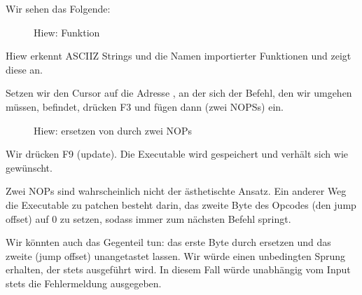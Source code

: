 Wir sehen das Folgende:

\begin{figure}[H]
\centering
{}
\caption{Hiew: \main Funktion}
\label{fig:scanf_ex3_hiew_1}
\end{figure}

Hiew erkennt \ac{ASCIIZ} Strings und die Namen importierter Funktionen und zeigt diese an.

\clearpage
Setzen wir den Cursor auf die Adresse , an der sich der  Befehl, den wir umgehen müssen, befindet,
drücken F3 und fügen dann  (zwei \ac{NOPS}s) ein. 

\begin{figure}[H]
\centering
{}
\caption{Hiew: ersetzen von  durch zwei \ac{NOP}s}
\label{fig:scanf_ex3_hiew_2}
\end{figure}
Wir drücken F9 (update). Die Executable wird gespeichert und verhält sich wie gewünscht.

Zwei \ac{NOP}s sind wahrscheinlich nicht der ästhetischte Ansatz. Ein anderer Weg die Executable zu patchen besteht
darin, das zweite Byte des Opcodes (den \gls{jump offset}) auf 0 zu setzen, sodass  immer zum nächsten Befehl
springt.

Wir könnten auch das Gegenteil tun: das erste Byte durch  ersetzen und das zweite (\gls{jump offset})
unangetastet lassen. Wir würde einen unbedingten Sprung erhalten, der stets ausgeführt wird.
In diesem Fall würde unabhängig vom Input stets die Fehlermeldung ausgegeben.
